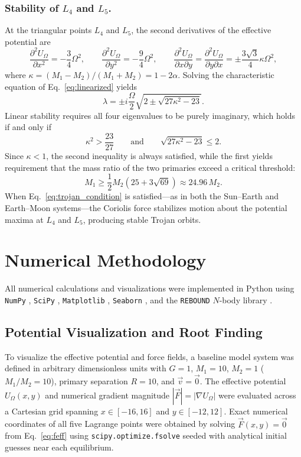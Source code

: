 \documentclass[12pt, letterpaper]{article}
\begin{document}
\subsubsection{Stability of \texorpdfstring{$L_4$ and $L_5$}{L4 and L5}.}
At the triangular points $L_4$ and $L_5$, the second derivatives of the effective potential are
$$
\frac{\partial^2 U_\Omega}{\partial x^2} = -\frac{3}{4}\Omega^2, \qquad
\frac{\partial^2 U_\Omega}{\partial y^2} = -\frac{9}{4}\Omega^2, \qquad
\frac{\partial^2 U_\Omega}{\partial x \partial y} = \frac{\partial^2 U_\Omega}{\partial y \partial x} = \pm \frac{3\sqrt{3}}{4}\kappa\Omega^2,
$$
where $\kappa = (M_1 - M_2)/(M_1 + M_2) = 1 - 2\alpha$. Solving the characteristic equation of Eq.~\eqref{eq:linearized} yields
$$
\lambda = \pm i \frac{\Omega}{2}\sqrt{2 \pm \sqrt{27\kappa^2 - 23}}.
$$
Linear stability requires all four eigenvalues to be purely imaginary, which holds if and only if \cite{cornish}
$$
\kappa^2 > \frac{23}{27} \qquad \text{and} \qquad \sqrt{27\kappa^2 - 23} \le 2. 
$$
Since $\kappa < 1$, the second inequality is always satisfied, while the first yields requirement that the mass ratio of the two primaries exceed a critical threshold:
\begin{equation}
M_1 \ge \frac{1}{2}M_2\left(25 + 3\sqrt{69}\right) \approx 24.96\, M_2.
\label{eq:trojan_condition}
\end{equation}
When Eq.~\eqref{eq:trojan_condition} is satisfied---as in both the Sun--Earth and Earth--Moon systems---the Coriolis force stabilizes motion about the potential maxima at $L_4$ and $L_5$, producing stable Trojan orbits.

\section{Numerical Methodology}

All numerical calculations and visualizations were implemented in Python using \texttt{NumPy} \cite{numpy}, \texttt{SciPy} \cite{scipy}, \texttt{Matplotlib} \cite{matplotlib}, \texttt{Seaborn} \cite{seaborn}, and the \texttt{REBOUND} $N$-body library \cite{rebound}.

\subsection{Potential Visualization and Root Finding}

To visualize the effective potential and force fields, a baseline model system was defined in arbitrary dimensionless units with $G = 1$, $M_1 = 10$, $M_2 = 1$ ($M_1/M_2 = 10$), primary separation $R = 10$, and $\vec{v} = \vec{0}$. The effective potential $U_\Omega(x, y)$ and numerical gradient magnitude $|\vec{F}| = |\nabla U_\Omega|$ were evaluated across a Cartesian grid spanning $x \in [-16, 16]$ and $y \in [-12, 12]$. Exact numerical coordinates of all five Lagrange points were obtained by solving $\vec{F}(x, y) = \vec{0}$ from Eq.~\eqref{eq:feff} using \texttt{scipy.optimize.fsolve} \cite{scipy} seeded with analytical initial guesses near each equilibrium.
\end{document}
